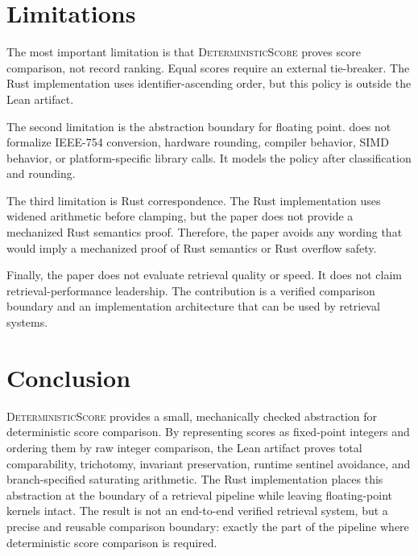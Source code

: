 \documentclass[a4paper,UKenglish,cleveref,autoref,thm-restate,anonymous]{lipics-v2021}
\newcommand{\leanname}[1]{\texttt{\detokenize{#1}}}
\newcommand{\ds}{\textsc{DeterministicScore}\xspace}
\begin{document}
\section{Limitations}
\label{sec:limitations}

The most important limitation is that \ds proves score comparison, not record ranking.  Equal scores require an external tie-breaker.  The Rust implementation uses identifier-ascending order, but this policy is outside the Lean artifact.

The second limitation is the abstraction boundary for floating point.  \leanname{FloatClass} does not formalize IEEE-754 conversion, hardware rounding, compiler behavior, SIMD behavior, or platform-specific library calls.  It models the policy after classification and rounding.

The third limitation is Rust correspondence.  The Rust implementation uses widened arithmetic before clamping, but the paper does not provide a mechanized Rust semantics proof.  Therefore, the paper avoids any wording that would imply a mechanized proof of Rust semantics or Rust overflow safety.

Finally, the paper does not evaluate retrieval quality or speed.  It does not claim retrieval-performance leadership.  The contribution is a verified comparison boundary and an implementation architecture that can be used by retrieval systems.

\section{Conclusion}
\label{sec:conclusion}

\ds provides a small, mechanically checked abstraction for deterministic score comparison.  By representing scores as fixed-point integers and ordering them by raw integer comparison, the Lean artifact proves total comparability, trichotomy, invariant preservation, runtime sentinel avoidance, and branch-specified saturating arithmetic.  The Rust implementation places this abstraction at the boundary of a retrieval pipeline while leaving floating-point kernels intact.  The result is not an end-to-end verified retrieval system, but a precise and reusable comparison boundary: exactly the part of the pipeline where deterministic score comparison is required.


\end{document}
